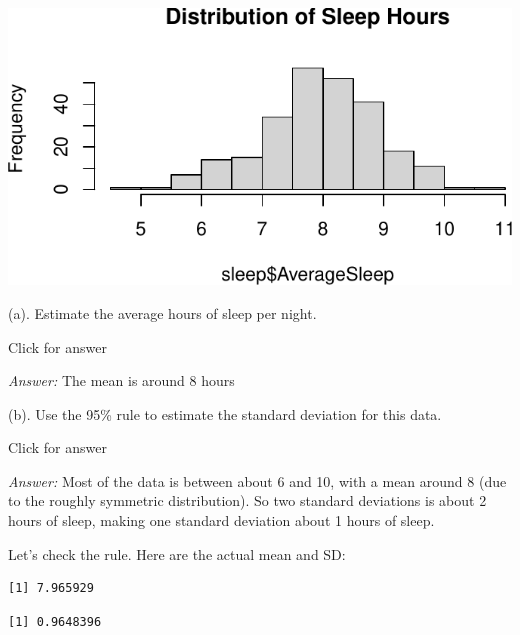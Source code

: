 \documentclass[
]{book}
\newenvironment{Shaded}{\begin{snugshade}}{\end{snugshade}}
\newcommand{\FunctionTok}[1]{\textcolor[rgb]{0.00,0.00,0.00}{#1}}
\newcommand{\NormalTok}[1]{#1}
\newcommand{\SpecialCharTok}[1]{\textcolor[rgb]{0.00,0.00,0.00}{#1}}
\begin{document}
\includegraphics[width=1\linewidth]{Class_Activity_5_files/figure-latex/unnamed-chunk-16-1}

(a). Estimate the average hours of sleep per night.

Click for answer

\emph{Answer:} The mean is around 8 hours

(b). Use the 95\% rule to estimate the standard deviation for this data.

Click for answer

\emph{Answer:} Most of the data is between about 6 and 10, with a mean around 8 (due to the roughly symmetric distribution). So two standard deviations is about 2 hours of sleep, making one standard deviation about 1 hours of sleep.

Let's check the rule. Here are the actual mean and SD:

\begin{Shaded}
\end{Shaded}

\begin{verbatim}
[1] 7.965929
\end{verbatim}

\begin{Shaded}
\end{Shaded}

\begin{verbatim}
[1] 0.9648396
\end{verbatim}
\end{document}
